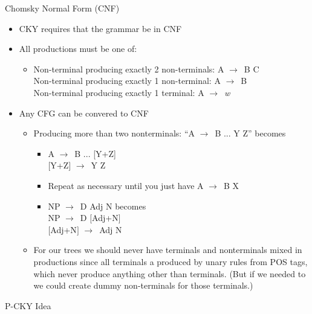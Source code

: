 \documentclass[11pt,letterpaper]{article}
\newcommand{\ra}{\ensuremath{\rightarrow}}
\begin{document}
Chomsky Normal Form (CNF)
\begin{itemize}
  \item CKY requires that the grammar be in CNF
  \item All productions must be one of:
	\begin{itemize}
	  \item Non-terminal producing exactly 2 non-terminals: A \ra\ B C\\
	        Non-terminal producing exactly 1 non-terminal: A \ra\ B\\
	        Non-terminal producing exactly 1 terminal: A \ra\ \textit{w}
	\end{itemize}
  \item Any CFG can be convered to CNF
	\begin{itemize}
	  \item Producing more than two nonterminals: ``A \ra\ B ... Y Z'' becomes
		\begin{itemize}
		  \item A \ra\ B ... [Y+Z] \\ $[$Y+Z$]$ \ra\ Y Z
		  \item Repeat as necessary until you just have  A \ra\ B X
		  \item NP \ra\ D Adj N becomes\\  NP \ra\ D $[$Adj+N$]$ \\ $[$Adj+N$]$ \ra\ Adj N
		\end{itemize}
	  \item For our trees we should never have terminals and nonterminals mixed in productions since all terminals a produced by unary rules from POS tags, which never produce anything other than terminals. (But if we needed to we could create dummy non-terminals for those terminals.)
	\end{itemize}
\end{itemize}


P-CKY Idea
\end{document}
